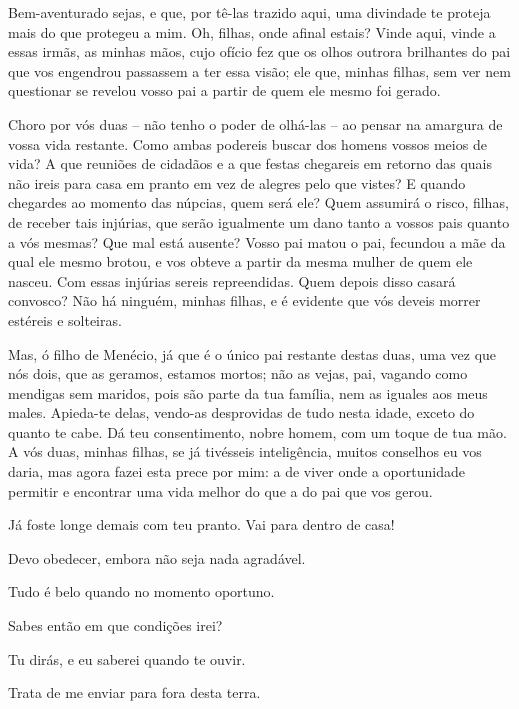    Bem-aventurado sejas, e que, por tê-las trazido aqui, uma divindade te
proteja mais do que protegeu a mim. Oh, filhas, onde afinal
estais? Vinde aqui, vinde a essas irmãs, as minhas mãos, cujo ofício fez
que os olhos outrora brilhantes do pai que vos engendrou passassem a ter
essa visão; ele que, minhas filhas, sem ver nem questionar se revelou
vosso pai a partir de quem ele mesmo foi gerado.

Choro por vós duas -- não tenho o poder de olhá-las -- ao pensar na
amargura de vossa vida restante. Como ambas podereis buscar dos homens
vossos meios de vida? A que reuniões de cidadãos e a que festas
chegareis em retorno das quais não ireis para casa em pranto em vez de
alegres pelo que vistes? E quando chegardes ao momento das núpcias, quem
será ele? Quem assumirá o risco, filhas, de receber tais injúrias, que
serão igualmente um dano tanto a vossos pais quanto a vós mesmas? Que
mal está ausente? Vosso pai matou o pai, fecundou a mãe da qual ele
mesmo brotou, e vos obteve a partir da mesma mulher de quem ele nasceu.
Com essas injúrias sereis repreendidas. Quem depois disso casará
convosco? Não há ninguém, minhas filhas, e é evidente que vós deveis
morrer estéreis e solteiras.

Mas, ó filho de Menécio, já que é o único pai restante destas duas, uma
vez que nós dois, que as geramos, estamos mortos; não as vejas, pai,
vagando como mendigas sem maridos, pois são parte da tua família, nem as
iguales aos meus males. Apieda-te delas, vendo-as desprovidas de tudo
nesta idade, exceto do quanto te cabe. Dá teu consentimento,
nobre homem, com um toque de tua mão. A vós duas, minhas filhas, se já
tivésseis inteligência, muitos conselhos eu vos daria, mas agora fazei
esta prece por mim: a de viver onde a oportunidade permitir e encontrar
uma vida melhor do que a do pai que vos gerou.

   Já foste longe demais com teu pranto. Vai para dentro de casa!

   Devo obedecer, embora não seja nada agradável.

   Tudo é belo quando no momento oportuno.

   Sabes então em que condições irei?

   Tu dirás, e eu saberei quando te ouvir.

   Trata de me enviar para fora desta terra.

